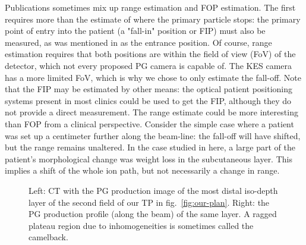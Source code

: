 \documentclass[a4paper,english]{article}
\begin{document}
Publications sometimes mix up range estimation and FOP estimation. The first requires more than the estimate of where the primary particle stops: the primary point of entry into the patient (a "fall-in" position or FIP) must also be measured, as was mentioned in \cite{Pinto2014a} as the entrance position. Of course, range estimation requires that both positions are within the field of view (FoV) of the detector, which not every proposed PG camera is capable of. The KES camera has a more limited FoV, which is why we chose to only estimate the fall-off. Note that the FIP may be estimated by other means: the optical patient positioning systems present in most clinics could be used to get the FIP, although they do not provide a direct measurement. The range estimate could be more interesting than FOP from a clinical perspective. Consider the simple case where a patient was set up a centimeter further along the beam-line: the fall-off will have shifted, but the range remains unaltered. In the case studied in here, a large part of the patient's morphological change was weight loss in the subcutaneous layer. This implies a shift of the whole ion path, but not necessarily a change in range.

\begin{figure}[htp]
  \captionsetup[subfigure]{labelformat=empty}
  \centering
  \quad\quad\quad
  \caption{Left: CT with the PG production image of the most distal iso-depth layer of the second field of our TP in fig.~\ref{fig:our-plan}. Right: the PG production profile (along the beam) of the same layer. A ragged plateau region due to inhomogeneities is sometimes called the camelback.}
  \label{fig:camelback}
\end{figure}
\end{document}
